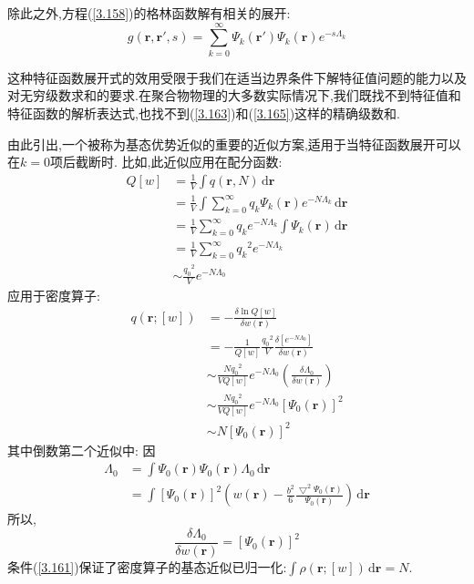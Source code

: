 除此之外,方程(\ref{3.158})的格林函数解有相关的展开:
\begin{equation}
g(\mathbf{r},\mathbf{r}',s) = \sum_{k=0}^{\infty}\Psi_k (\mathbf{r}')\Psi_k (\mathbf{r})e^{-s\Lambda_k} \label{3.165}
\end{equation}

这种特征函数展开式的效用受限于我们在适当边界条件下解特征值问题的能力以及对无穷级数求和的要求.在聚合物物理的大多数实际情况下,我们既找不到特征值和特征函数的解析表达式,也找不到(\ref{3.163})和(\ref{3.165})这样的精确级数和.

由此引出,一个被称为基态优势近似的重要的近似方案,适用于当特征函数展开可以在$k=0$项后截断时.
比如,此近似应用在配分函数:
\begin{equation}
\begin{aligned}
Q[w] &= \frac{1}{V}\int q(\mathbf{r},N)\,\mathrm{d}\mathbf{r}\\
&= \frac{1}{V}\int \sum_{k=0}^{\infty}q_k \Psi_k (\mathbf{r})e^{-N\Lambda_k}\,\mathrm{d}\mathbf{r}\\
&= \frac{1}{V} \sum_{k=0}^{\infty}q_k e^{-N\Lambda_k}\int \Psi_k (\mathbf{r})\,\mathrm{d}\mathbf{r}\\
&= \frac{1}{V} \sum_{k=0}^{\infty}{q_k}^2 e^{-N\Lambda_k}\\
&\sim \frac{{q_0}^2}{V}e^{-N\Lambda_0}
\end{aligned}
\end{equation}
应用于密度算子:
\begin{equation}
\begin{aligned}
q(\mathbf{r};[w]) &= -\frac{\delta \ln Q[w]}{\delta w(\mathbf{r})}\\
&= -\frac{1}{Q[w]} \frac{{q_0}^2}{V} \frac{\delta[e^{-N\Lambda_0}]}{\delta w(\mathbf{r})}\\
&\sim \frac{N {q_0}^2}{V Q[w]}e^{-N\Lambda_0}(\frac{\delta \Lambda_0}{\delta w(\mathbf{r})})\\
&\sim \frac{N {q_0}^2}{V Q[w]}e^{-N\Lambda_0}[\Psi_0 (\mathbf{r})]^2\\
&\sim N [\Psi_0 (\mathbf{r})]^2 \label{3.167}
\end{aligned}
\end{equation}
其中倒数第二个近似中:
因
$$
\begin{aligned}
\Lambda_0 &= \int \Psi_0 (\mathbf{r})\Psi_0 (\mathbf{r}) \Lambda_0\,\mathrm{d}\mathbf{r}\\
&= \int [\Psi_0 (\mathbf{r})]^2(w(\mathbf{r})-\frac{b^2}{6} \frac{\bigtriangledown^2 \Psi_0 (\mathbf{r})}{\Psi_0 (\mathbf{r})})\,\mathrm{d}\mathbf{r}
\end{aligned}
$$
所以,
$$\frac{\delta \Lambda_0}{\delta w(\mathbf{r})} = [\Psi_0 (\mathbf{r})]^2$$
条件(\ref{3.161})保证了密度算子的基态近似已归一化:$\int \rho(\mathbf{r};[w])\,\mathrm{d}\mathbf{r} = N$.

